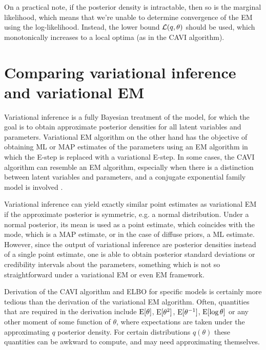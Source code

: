 On a practical note, if the posterior density is intractable, then so is the marginal likelihood, which means that we're unable to determine convergence of the EM using the log-likelihood.
Instead, the lower bound ${\mathcal L}(q,\theta)$ should be used, which monotonically increases to a local optima (as in the CAVI algorithm).

\section{Comparing variational inference and variational EM}

Variational inference is a fully Bayesian treatment of the model, for which the goal is to obtain approximate posterior densities for all latent variables and parameters.
Variational EM algorithm on the other hand has the objective of obtaining ML or MAP estimates of the parameters using an EM algorithm in which the E-step is replaced with a variational E-step.
In some cases, the CAVI algorithm can resemble an EM algorithm, especially when there is a distinction between latent variables and parameters, and a conjugate exponential family model is involved \citep{blei2017variational}.

Variational inference can yield exactly similar point estimates as variational EM if the approximate posterior is symmetric, e.g. a normal distribution.
Under a normal posterior, its mean is used as a point estimate, which coincides with the mode, which is a MAP estimate, or in the case of diffuse priors, a ML estimate.
However, since the output of variational inference are posterior densities instead of a single point estimate, one is able to obtain posterior standard deviations or credibility intervals about the parameters, something which is not so straightforward under a variational EM or even EM framework.

Derivation of the CAVI algorithm and ELBO for specific models is certainly more tedious than the derivation of the variational EM algorithm.
Often, quantities that are required in the derivation include $\operatorname{E}[\theta]$, $\operatorname{E}[\theta^2]$, $\operatorname{E}[\theta^{-1}]$, $\operatorname{E}[\log \theta]$ or any other moment of some function of $\theta$, where expectations are taken under the approximating $q$ posterior density.
For certain distributions $q(\theta)$ these quantities can be awkward to compute, and may need approximating themselves.

